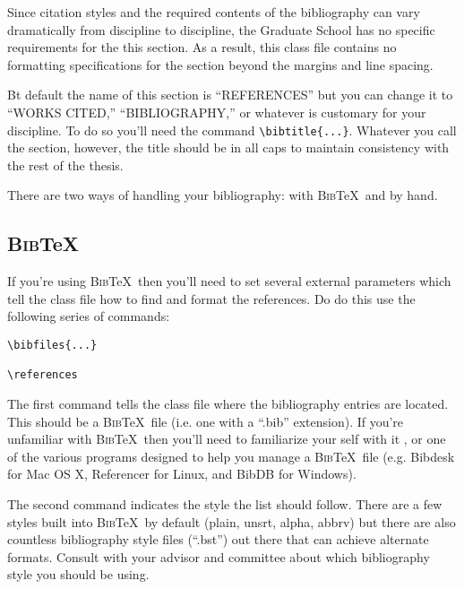 Since citation styles and the required contents of the bibliography can vary dramatically from discipline to discipline, the Graduate School has no specific requirements for the this section.  As a result, this class file contains no formatting specifications for the section beyond the margins and line spacing.

Bt default the name of this section is ``REFERENCES'' but you can change it to ``WORKS CITED,'' ``BIBLIOGRAPHY,'' or whatever is customary for your discipline.  To do so you'll need the command \verb=\bibtitle{...}=.  Whatever you call the section, however, the title should be in all caps to maintain consistency with the rest of the thesis.

There are two ways of handling your bibliography: with \textsc{Bib}\TeX\ and by hand.

\subsection{\textsc{Bib}\TeX}
If you're using \textsc{Bib}\TeX\ then you'll need to set several external parameters which tell the class file how to find and format the references.  Do do this use the following series of commands:

\begin{verbatim}
\bibfiles{...}

\references
\end{verbatim}

The first command tells the class file where the bibliography entries are located.  This should be a \textsc{Bib}\TeX\ file (i.e. one with a ``.bib'' extension).  If you're unfamiliar with \textsc{Bib}\TeX\ then you'll need to familiarize your self with it \citep{Feder:2006}, or one of the various programs designed to help you manage a \textsc{Bib}\TeX\ file (e.g. Bibdesk \citep{BibDesk} for Mac OS X, Referencer \citep{Spray:2007} for Linux, and BibDB \citep{Doron:1999} for Windows).

The second command indicates the style the list should follow.  There are a few styles built into \textsc{Bib}\TeX\ by default (plain, unsrt, alpha, abbrv) but there are also countless bibliography style files (``.bst'') out there that can achieve alternate formats.  Consult with your advisor and committee about which bibliography style you should be using.

